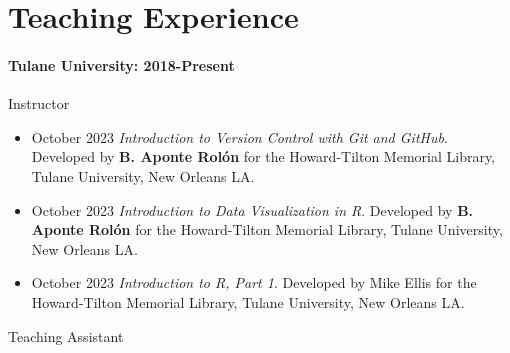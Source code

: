 \documentclass[11pt,a4paper,]{awesome-cv}
\begin{document}
\hypertarget{teaching-experience}{%
\section{\texorpdfstring{ Teaching
Experience}{ Teaching Experience}}\label{teaching-experience}}

\hypertarget{tulane-university-2018-present}{%
\paragraph{\texorpdfstring{Tulane University: 2018-Present\\
}{Tulane University: 2018-Present }}\label{tulane-university-2018-present}}

Instructor

\begin{itemize}
\item
  October 2023 \textbar{} \emph{Introduction to Version Control with Git
  and GitHub}. Developed by \textbf{B. Aponte Rolón} for the
  Howard-Tilton Memorial Library, Tulane University, New Orleans LA.
\item
  October 2023 \textbar{} \emph{Introduction to Data Visualization in
  R}. Developed by \textbf{B. Aponte Rolón} for the Howard-Tilton
  Memorial Library, Tulane University, New Orleans LA.
\item
  October 2023 \textbar{} \emph{Introduction to R, Part 1}. Developed by
  Mike Ellis for the Howard-Tilton Memorial Library, Tulane University,
  New Orleans LA.
\end{itemize}

Teaching Assistant
\end{document}
